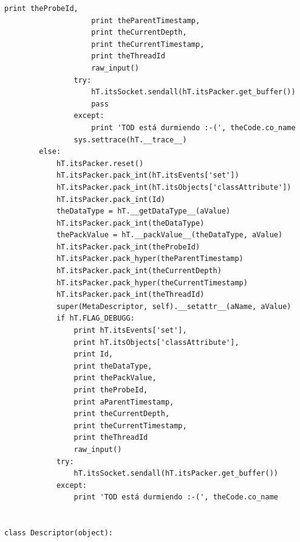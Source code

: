 \documentclass[12pt,legalpaper]{report}
\begin{document}
\begin{singlespace}
\begin{lstlisting}[style=Python]
                    print theProbeId,
                    print theParentTimestamp,
                    print theCurrentDepth,
                    print theCurrentTimestamp,
                    print theThreadId
                    raw_input()
                try:
                    hT.itsSocket.sendall(hT.itsPacker.get_buffer())
                    pass
                except:
                    print 'TOD está durmiendo :-(', theCode.co_name    
                sys.settrace(hT.__trace__)
        else:
            hT.itsPacker.reset()
            hT.itsPacker.pack_int(hT.itsEvents['set'])
            hT.itsPacker.pack_int(hT.itsObjects['classAttribute'])
            hT.itsPacker.pack_int(Id)
            theDataType = hT.__getDataType__(aValue)
            hT.itsPacker.pack_int(theDataType)
            thePackValue = hT.__packValue__(theDataType, aValue)
            hT.itsPacker.pack_int(theProbeId)
            hT.itsPacker.pack_hyper(theParentTimestamp)        
            hT.itsPacker.pack_int(theCurrentDepth)
            hT.itsPacker.pack_hyper(theCurrentTimestamp)
            hT.itsPacker.pack_int(theThreadId)
            super(MetaDescriptor, self).__setattr__(aName, aValue)
            if hT.FLAG_DEBUGG:
                print hT.itsEvents['set'],
                print hT.itsObjects['classAttribute'],
                print Id,
                print theDataType,
                print thePackValue,
                print theProbeId,
                print aParentTimestamp,
                print theCurrentDepth,
                print theCurrentTimestamp,
                print theThreadId
                raw_input()
            try:
                hT.itsSocket.sendall(hT.itsPacker.get_buffer())
            except:
                print 'TOD está durmiendo :-(', theCode.co_name    
        

class Descriptor(object):


\end{lstlisting}
\end{singlespace}
\end{document}
